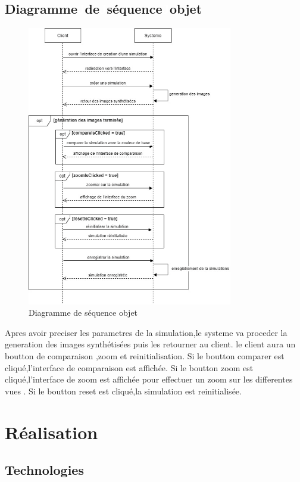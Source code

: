 \subsection{Diagramme\textcolor{white}{J}de\textcolor{white}{J}séquence\textcolor{white}{J}objet}
\begin{figure}[!ht]\centering
\includegraphics[width=0.8\textwidth,angle=00]{chapitres/chapitre5/figures/Seq.png}
\caption{Diagramme de séquence objet}
\label{fig:OffreSeq}
\end{figure}

Apres avoir preciser les parametres de la simulation,le systeme va proceder la generation des images synthétisées puis les retourner au client.
le client aura un boutton de comparaison ,zoom et reinitialisation.
Si le boutton comparer est cliqué,l'interface de comparaison est affichée. 
Si le boutton zoom est cliqué,l'interface de zoom est affichée pour effectuer un zoom sur les differentes vues . 
Si le boutton reset est cliqué,la simulation est reinitialisée. 

\newpage
\section{Réalisation}
\subsection{Technologies}
